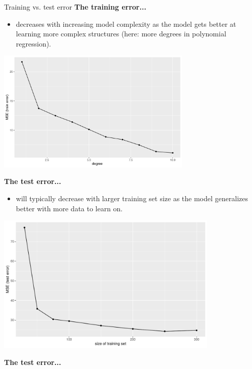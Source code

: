 \begin{vbframe}{Training vs. test error}
\textbf{The training error...}
\begin{itemize}  
  \item decreases with increasing model complexity as the model gets better at
  learning more complex structures (here: more degrees in polynomial regression).
\end{itemize}

\begin{center}
\includegraphics[width=0.7\textwidth]{figure/fig-train-vs-test-error-4}
\end{center}

\framebreak

\textbf{The test error...}

\begin{itemize}
  \item will typically decrease with larger training set size as the model 
  generalizes better with more data to learn on.
  
\end{itemize}
\begin{center}
\includegraphics[width=0.8\textwidth]{figure/fig-train-vs-test-error-2}
\end{center} 

\framebreak
\textbf{The test error...}

\begin{itemize}  
  

\end{itemize}
\end{vbframe}
